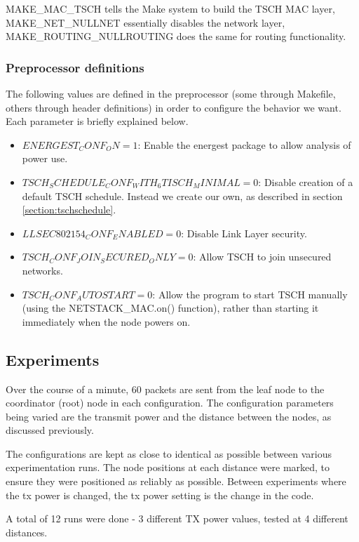 \documentclass[conference]{IEEEtran}
\begin{document}
MAKE\_MAC\_TSCH tells the Make system to build the TSCH MAC layer, MAKE\_NET\_NULLNET essentially disables the network layer, MAKE\_ROUTING\_NULLROUTING does the same for routing functionality. 

\subsubsection{Preprocessor definitions}

The following values are defined in the preprocessor (some through Makefile, others through header definitions) in order to configure the behavior we want. Each parameter is briefly explained below.

\label{section:preprocessdef}
\begin{itemize}
\item $ENERGEST_CONF_ON=1$: Enable the energest package to allow analysis of power use. 
\item $TSCH_SCHEDULE_CONF_WITH_6TISCH_MINIMAL=0$: Disable creation of a default TSCH schedule. Instead we create our own, as described in section \ref{section:tschschedule}.
\item $LLSEC802154_CONF_ENABLED=0$: Disable Link Layer security.
\item $TSCH_CONF_JOIN_SECURED_ONLY=0$: Allow TSCH to join unsecured networks.
\item $TSCH_CONF_AUTOSTART=0$: Allow the program to start TSCH manually (using the NETSTACK\_MAC.on() function), rather than starting it immediately when the node powers on.
\end{itemize}


\subsection{Experiments}

Over the course of a minute, 60 packets are sent from the leaf node to the coordinator (root) node in each configuration. The configuration parameters being varied are the transmit power and the distance between the nodes, as discussed previously. 

The configurations are kept as close to identical as possible between various experimentation runs. The node positions at each distance were marked, to ensure they were positioned as reliably as possible. Between experiments where the tx power is changed, the tx power setting is the change in the code. 

A total of 12 runs were done - 3 different TX power values, tested at 4 different distances. 
\end{document}
